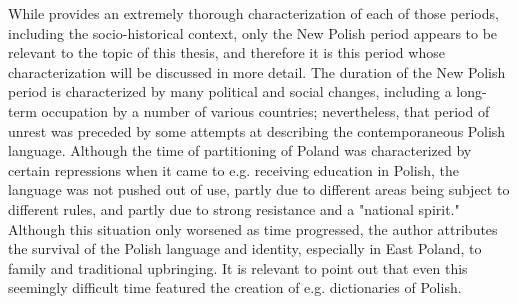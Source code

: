 While \citet{klemensiewicz_76} provides an extremely thorough characterization of each of those periods, including the socio-historical context, only the New Polish period appears to be relevant to the topic of this thesis, and therefore it is this period whose characterization will be discussed in more detail. The duration of the New Polish period is characterized by many political and social changes, including a long-term occupation by a number of various countries; nevertheless, that period of unrest was preceded by some attempts at describing the contemporaneous Polish language. Although the time of partitioning of Poland was characterized by certain repressions when it came to e.g. receiving education in Polish, the language was not pushed out of use, partly due to different areas being subject to different rules, and partly due to strong resistance and a "national spirit." Although this situation only worsened as time progressed, the author attributes the survival of the Polish language and identity, especially in East Poland, to family and traditional upbringing. It is relevant to point out that even this seemingly difficult time featured the creation of e.g. dictionaries of Polish.  


